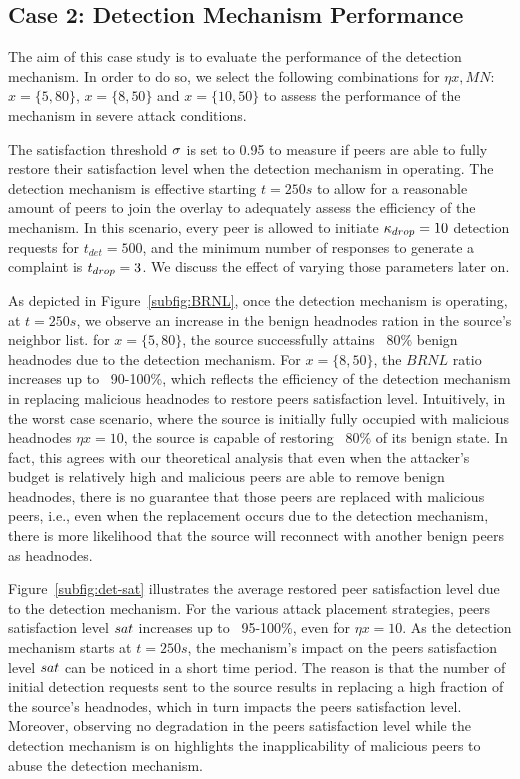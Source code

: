 \subsection{Case 2: Detection Mechanism Performance}

The aim of this case study is to evaluate the performance of the detection mechanism.
In order to do so, we select the following combinations for $\eta x, MN$: $x=\{5, 80\}$, $x=\{8, 50\}$ and $x=\{10, 50\}$ to assess the performance of the mechanism in severe attack conditions.

The satisfaction threshold $\sigma$ is set to 0.95 to measure if peers are able to fully restore their satisfaction level when the detection mechanism in operating.
The detection mechanism is effective starting $t=250s$ to allow for a reasonable amount of peers to join the overlay to adequately assess the efficiency of the mechanism.
In this scenario, every peer is allowed to initiate $\kappa_{drop}=10$ detection requests for $t_{det}=500$, and the minimum number of responses to generate a complaint is $t_{drop}=3$. 
We discuss the effect of varying those parameters later on.

As depicted in Figure~\ref{subfig:BRNL}, once the detection mechanism is operating, at $t=250s$, we observe an increase in the benign headnodes ration in the source's neighbor list.
for $x=\{5, 80\}$, the source successfully attains ~80\% benign headnodes due to the detection mechanism.
For $x=\{8, 50\}$, the $BRNL$ ratio increases up to ~90-100\%, which reflects the efficiency of the detection mechanism in replacing malicious headnodes to restore peers satisfaction level.
Intuitively, in the worst case scenario, where the source is initially fully occupied with malicious headnodes $\eta x=10$, the source is capable of restoring ~80\% of its benign state.
In fact, this agrees with our theoretical analysis that even when the attacker's budget is relatively high and malicious peers are able to remove benign headnodes, there is no guarantee that those peers are replaced with malicious peers, 
i.e., even when the replacement occurs due to the detection mechanism, there is more likelihood that the source will reconnect with another benign peers as headnodes.


Figure~\ref{subfig:det-sat} illustrates the average restored peer satisfaction level due to the detection mechanism.
For the various attack placement strategies, peers satisfaction level $sat$ increases up to ~95-100\%, even for $\eta x=10$.
As the detection mechanism starts at $t=250s$, the mechanism's impact on the peers satisfaction level $sat$ can be noticed in a short time period.
The reason is that the number of initial detection requests sent to the source results in replacing a high fraction of the source's headnodes, which in turn impacts the peers satisfaction level.
Moreover, observing no degradation in the peers satisfaction level while the detection mechanism is on highlights the inapplicability of malicious peers to abuse the detection mechanism.

